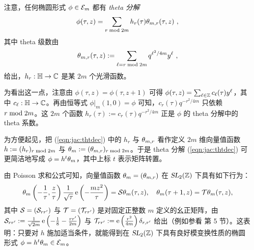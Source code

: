 
注意，任何椭圆形式 $\phi\in\mathcal{E}_m$ 都有 {\em theta 分解}
\begin{gather}\label{eqn:jac:thtdec}
\phi(\tau,z)=\sum_{r{\rm \;mod\;} 2m} h_r(\tau)\theta_{m,r}(\tau,z)~,
\end{gather}
其中 theta 级数由 $$\theta_{m,r}(\tau,z):=\sum_{\ell=r{\rm \;mod\;} 2m}q^{\ell^2/4m}y^\ell~,$$
给出，$h_r:\mathbb{H}\to \mathbb{C}$ 是某 $2m$ 个光滑函数。


为看出这一点，注意由 $\phi(\tau,z)=\phi(\tau,z+1)$ 可得 $\phi(\tau,z)=\sum_{\ell \in\mathbb{Z}} c_\ell (\tau)y^\ell $，其中 $c_\ell :\mathbb{H}\to\mathbb{C}$。再由恒等式 $\phi|_m(1,0)=\phi$ 可知，$c_r(\tau)q^{-r^2/4m}$ 只依赖 $r{\rm \;mod\;} 2m$。这 $2m$ 个函数 $h_r(\tau):=c_r(\tau)q^{-r^2/4m}$ 正是 $\phi$ 的 theta 分解中的 theta 系数。

为方便起见，把 (\ref{eqn:jac:thtdec}) 中的 $h_r$ 与 $\theta_{m,r}$ 看作定义 $2m$ 维向量值函数 $h:=(h_r)_{r{\rm \;mod\;} 2m}$ 与 $\theta_m:=(\theta_{m,r})_{r{\rm \;mod\;} 2m}$。于是 theta 分解 (\ref{eqn:jac:thtdec}) 可更简洁地写成 $\phi=h^t\theta_m$，其中上标 $t$ 表示矩阵转置。

由 Poisson 求和公式可知，向量值函数 $\theta_{m}=(\theta_{m,r})$ 在 $\operatorname{\textsl{SL}}_2(\mathbb{Z})$ 下具有如下行为：
\begin{gather}\label{transf_theta}
\theta_m\left(-\frac1\tau,\frac{z}\tau\right)\frac{1}{\sqrt{\tau}}\operatorname{e}\left(-\frac{mz^2}{\tau}\right)
=
{\cal S}\theta_m(\tau,z),\quad
\theta_{m}(\tau+1,z)
={\cal T}\theta_m(\tau,z),
\end{gather}
其中 ${\cal S}=({\cal S}_{rr'})$ 与 ${\cal T}=({\cal T}_{rr'})$ 是对固定正整数 $m$ 定义的幺正矩阵，由 ${\cal S}_{rr'}:=\frac1{\sqrt{2m}}\operatorname{e}\left(-\frac{1}{8}-\frac{rr'}{2m}\right)$ 与 ${\cal T}_{rr'}:=\operatorname{e}\left(\frac{r^2}{4m}\right)\delta_{r,r'}$ 给出（例如参看 \cite{eichler_zagier} 第 5 节）。这表明：只要对 $h$ 施加适当条件，就能得到在 $\operatorname{\textsl{SL}}_2(\mathbb{Z})$ 下具有良好模变换性质的椭圆形式 $\phi=h^t\theta_m\in\mathcal{E}_m$。

